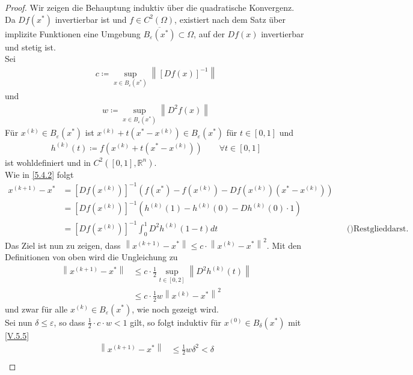 \documentclass[ngerman,fontsize=11pt, paper=a4, parskip=half, titlepage=true, toc=bib]{scrbook}
\theoremstyle{definition}
\theoremstyle{plain}
\newcommand{\Ren}{\mathds{R}^{n}}
\newcommand{\nn}[1]{\left\| #1 \right\|}
\begin{document}
\begin{proof}
    Wir zeigen die Behauptung induktiv über die quadratische Konvergenz.\\
    Da $Df(x^{*})$ invertierbar ist und $f\in C^2(\Omega) $,
    existiert nach dem Satz über implizite Funktionen
    eine Umgebung $\overline{B_\varepsilon(x^{*})}\subset \Omega$,
    auf der $Df(x)$ invertierbar und stetig ist.\\
    Sei 
    \begin{gather*}
      c\coloneqq \sup_{x\in B_\varepsilon(x^{*})} \nn{[Df(x)]^{-1}}
    \end{gather*}
    und 
    \begin{gather*}
      w\coloneqq \sup_{x\in B_\varepsilon(x^{*})}\nn{D^2f(x)}
    \end{gather*}
    Für $x^{(k)}\in B_\varepsilon(x^{*}) $ ist $x^{(k)}+t(x^{*}-x^{(k)})\in B_\varepsilon(x^{*})$
    für $t\in [0,1]$ und 
    \begin{gather*}
      h^{(k)}(t) \coloneqq f(x^{(k)}+ t(x^{*}-x^{(k)}))\qquad \forall t\in [0,1]
    \end{gather*}
    ist wohldefiniert und in $C^2([0,1], \Ren)$.\\
    Wie in \ref{5.4.2} folgt 
    \begin{align*}
      x^{(k+1)}-x^{*} &= [Df(x^{(k)})]^{-1}\left(f(x^{*})-f(x^{(k)})-Df(x^{(k)})(x^{*}-x^{(k)})\right)\\
                      &= [Df(x^{(k)})]^{-1}\left( h^{(k)}(1)-h^{(k)}(0)-Dh^{(k)}(0)\cdot 1\right)\\
                      &= [Df(x^{(k)})]^{-1} \int_{0}^{1}D^2h^{(k)}(1-t)dt &&\text{()Restglieddarst. der Taylorentw.)}
    \end{align*}
    Das Ziel ist nun zu zeigen, dass $\nn{x^{(k+1)}-x^{*}} \leq c\cdot \nn{x^{(k)}-x^{*}}^2$.
    Mit den Definitionen von oben wird die Ungleichung zu
    \begin{align}\nonumber
      \nn{x^{(k+1)}-x^{*}} &\leq c\cdot \frac{1}{2} \sup_{t\in[0,2]} \nn{D^2h^{(k)}(t)} \\
                           & \leq c\cdot \frac{1}{2} w\nn{x^{(k)}-x^{*}}^2
                             \label{V.5.5}
    \end{align}
    und zwar für alle $x^{(k)}\in B_\varepsilon(x^{*})$, wie noch gezeigt wird.\\
    Sei nun $\delta \leq \varepsilon$, so dass $\frac{1}{2} \cdot c\cdot w <1$ gilt,
    so folgt induktiv für $x^{(0)}\in B_\delta(x^{*})$ mit \eqref{V.5.5}
    \begin{align*}
      \nn{x^{(k+1)}-x^{*}} &\leq \frac{1}{2}w\delta^2 < \delta\\

\end{align*}
\end{proof}
\end{document}
